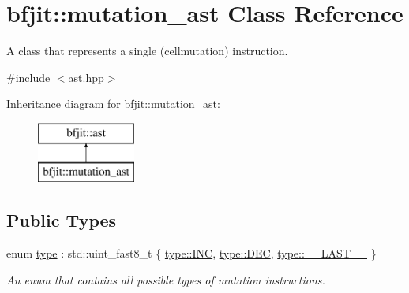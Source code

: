 \hypertarget{classbfjit_1_1mutation__ast}{}\section{bfjit\+:\+:mutation\+\_\+ast Class Reference}
\label{classbfjit_1_1mutation__ast}


A class that represents a single (cellmutation) instruction.  




{\ttfamily \#include $<$ast.\+hpp$>$}

Inheritance diagram for bfjit\+:\+:mutation\+\_\+ast\+:\begin{figure}[H]
\begin{center}
\leavevmode
\includegraphics[height=2.000000cm]{classbfjit_1_1mutation__ast}
\end{center}
\end{figure}
\subsection*{Public Types}
\begin{DoxyCompactItemize}
\item 
enum \hyperlink{classbfjit_1_1mutation__ast_a4a35ab616dab7944deedac4300f473e9}{type} \+: std\+::uint\+\_\+fast8\+\_\+t \{ \hyperlink{classbfjit_1_1mutation__ast_a4a35ab616dab7944deedac4300f473e9a38924f2227ebf15f4bdc6dca5c5eca91}{type\+::\+I\+NC}, 
\hyperlink{classbfjit_1_1mutation__ast_a4a35ab616dab7944deedac4300f473e9a38344a4d87bb35ec197f26fad338b6ab}{type\+::\+D\+EC}, 
\hyperlink{classbfjit_1_1mutation__ast_a4a35ab616dab7944deedac4300f473e9a62bd5a4afef994ba01e631cbf00f85be}{type\+::\+\_\+\+\_\+\+L\+A\+S\+T\+\_\+\+\_\+}
 \}\begin{DoxyCompactList}\small\item\em An enum that contains all possible types of mutation instructions. \end{DoxyCompactList}
\end{DoxyCompactItemize}
